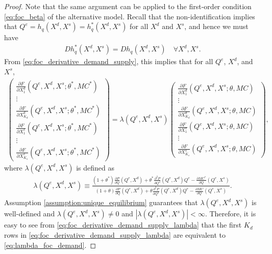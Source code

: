 \documentclass[11pt, a4paper]{article}
\theoremstyle{remark}
\begin{document}
\begin{proof}
Note that the same argument can be applied to the first-order condition \eqref{eq:foc_beta} of the alternative model.
Recall that the non-identification implies that $Q^e = h_q(X^{d}, X^{s}) = h_q^{*}(X^{d}, X^{s})$ for all $X^{d}$ and $X^{s}$, and hence we must have
\begin{align}
    Dh_q^{*}(X^{d}, X^{s}) = Dh_q(X^{d}, X^{s}) \quad \forall X^{d}, X^{s}. \label{eq:observale_equivalence_derivative}
\end{align}
From \eqref{eq:foc_derivative_demand_supply}, this implies that for all $Q^e$, $X^{d}$, and $X^{s}$,
\begin{align}
    \begin{pmatrix}
        \frac{\partial F}{\partial X^{d}_{1}}(Q^e, X^{d}, X^{s}; \theta^{*}, MC^{*})\\
        \vdots \\
        \frac{\partial F}{\partial X^{d}_{K_d}}(Q^e, X^{d}, X^{s}; \theta^{*}, MC^{*})\\
        \frac{\partial F}{\partial X^{s}_{1}}(Q^e, X^{d}, X^{s}; \theta^{*}, MC^{*})\\
        \vdots \\
        \frac{\partial F}{\partial X^{s}_{K_s}}(Q^e, X^{d}, X^{s}; \theta^{*}, MC^{*})
    \end{pmatrix}
    = \lambda(Q^e, X^{d}, X^{s})
    \begin{pmatrix}
        \frac{\partial F}{\partial X^{d}_{1}}(Q^e, X^{d}, X^{s}; \theta, MC)\\
        \vdots \\
        \frac{\partial F}{\partial X^{d}_{K_d}}(Q^e, X^{d}, X^{s}; \theta, MC)\\
        \frac{\partial F}{\partial X^{s}_{1}}(Q^e, X^{d}, X^{s}; \theta, MC)\\
        \vdots \\
        \frac{\partial F}{\partial X^{s}_{K_s}}(Q^e, X^{d}, X^{s}; \theta, MC)
    \end{pmatrix},\label{eq:foc_derivative_demand_supply_lambda}
\end{align}
where $\lambda(Q^e, X^{d}, X^{s})$ is defined as
\begin{align}
    \lambda(Q^e, X^{d}, X^{s}) \equiv \frac{(1+\theta^{*})\frac{\partial P}{\partial Q}(Q^e, X^{d}) + \theta^{*}\frac{\partial^2 P}{\partial Q^2}(Q^e, X^{d})Q^e - \frac{\partial MC^{*}}{\partial Q}(Q^e, X^{s})}{(1+\theta)\frac{\partial P}{\partial Q}(Q^e, X^{d}) + \theta\frac{\partial^2 P}{\partial Q^2}(Q^e, X^{d})Q^e - \frac{\partial MC}{\partial Q}(Q^e, X^{s})}. \label{eq:lambda_foc}
\end{align}
Assumption \ref{assumption:unique_equilibrium} guarantees that $\lambda(Q^e, X^{d}, X^{s})$ is well-defined and $\lambda(Q^e, X^{d}, X^{s}) \ne 0$ and $|\lambda(Q^e, X^{d}, X^{s})| < \infty$.
Therefore, it is easy to see from \eqref{eq:foc_derivative_demand_supply_lambda} that the first $K_d$ rows in \eqref{eq:foc_derivative_demand_supply_lambda} are equivalent to \eqref{eq:lambda_foc_demand}.
\end{proof}
\end{document}
